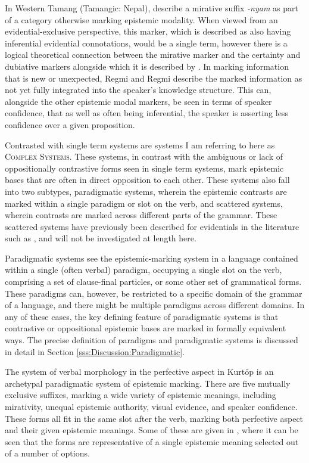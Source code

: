 In Western Tamang (Tamangic: Nepal),  describe a mirative suffix \textit{-nyam} as part of a category otherwise marking epistemic modality. When viewed from an evidential-exclusive perspective, this marker, which is described as also having inferential evidential connotations, would be a single term, however there is a logical theoretical connection between the mirative marker and the certainty and dubiative markers alongside which it is described by . In marking information that is new or unexpected, Regmi and Regmi describe the marked information as not yet fully integrated into the speaker's knowledge structure. This can, alongside the other epistemic modal markers, be seen in terms of speaker confidence, that as well as often being inferential, the speaker is asserting less confidence over a given proposition.

Contrasted with single term systems are systems I am referring to here as \textsc{Complex Systems}. These systems, in contrast with the ambiguous or lack of oppositionally contrastive forms seen in single term systems, mark epistemic bases that are often in direct opposition to each other. These systems also fall into two subtypes, paradigmatic systems, wherein the epistemic contrasts are marked within a single paradigm or slot on the verb, and scattered systems, wherein contrasts are marked across different parts of the grammar. These scattered systems have previously been described for evidentials in the literature such as , and will not be investigated at length here.

Paradigmatic systems see the epistemic-marking system in a language contained within a single (often verbal) paradigm, occupying a single slot on the verb, comprising a set of clause-final particles, or some other set of grammatical forms. These paradigms can, however, be restricted to a specific domain of the grammar of a language, and there might be multiple paradigms across different domains. In any of these cases, the key defining feature of paradigmatic systems is that contrastive or oppositional epistemic bases are marked in formally equivalent ways. The precise definition of paradigms and paradigmatic systems is discussed in detail in Section \ref{sss:Discussion:Paradigmatic}.

The system of verbal morphology in the perfective aspect in Kurtöp \cite[East Bodish: Bhutan,][]{Hyslop2018} is an archetypal paradigmatic system of epistemic marking. There are five mutually exclusive suffixes, marking a wide variety of epistemic meanings, including mirativity, unequal epistemic authority, visual evidence, and speaker confidence. These forms all fit in the same slot after the verb, marking both perfective aspect and their given epistemic meanings. Some of these are given in , where it can be seen that the forms are representative of a single epistemic meaning selected out of a number of options.

